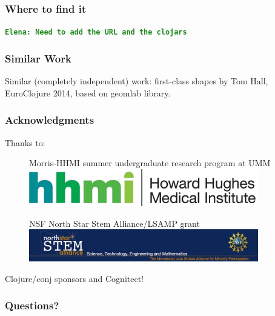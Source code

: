 \documentclass{beamer}
\newcommand{\comment}[1]{{\bf \tt  {#1}}}
\newcommand{\emcomment}[1]{\textcolor{ForestGreen}{\comment{Elena: {#1}}}}
\begin{document}
\begin{frame}
	\frametitle{Where to find it}
	\emcomment{Need to add the URL and the clojars}
\end{frame}

\begin{frame}
	\frametitle{Similar Work}
Similar (completely independent) work: first-class shapes by Tom Hall, EuroClojure 2014, based on geomlab library. 
\end{frame} 

\begin{frame}
\frametitle{Acknowledgments}
	{\large Thanks to:}
	\begin{figure}
		Morris-HHMI summer undergraduate research program at UMM \includegraphics[width=10cm]{PresentationImages/logoHHMI.jpg}
	\end{figure}
	\begin{figure}
		NSF North Star Stem Alliance/LSAMP grant 
		\includegraphics[width=10cm]{PresentationImages/logoStem.jpg}
	\end{figure}	
	{\centering \qquad Clojure/conj sponsors and Cognitect!}
\end{frame}

\begin{frame}
\frametitle{Questions?}
\end{frame}
\end{document}
